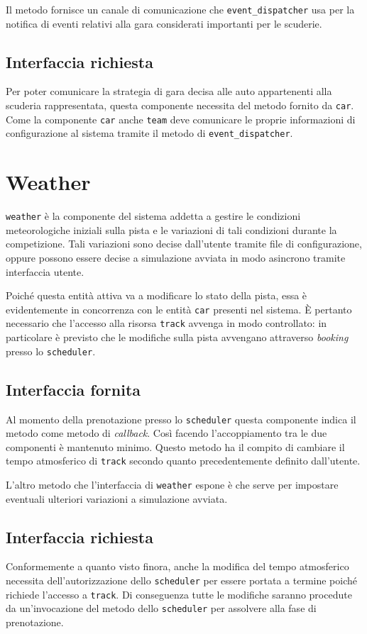 Il metodo  fornisce un canale di comunicazione che \texttt{event\_dispatcher} usa per la notifica di eventi relativi alla gara considerati importanti per le scuderie.

\subsection*{Interfaccia richiesta}
Per poter comunicare la strategia di gara decisa alle auto appartenenti alla scuderia rappresentata, questa componente necessita del metodo  fornito da \texttt{car}.
Come la componente \texttt{car} anche \texttt{team} deve comunicare le proprie informazioni di configurazione al sistema tramite il metodo  di \texttt{event\_dispatcher}.

\section{Weather}
\texttt{weather} è la componente del sistema addetta a gestire le condizioni meteorologiche iniziali sulla pista e le variazioni di tali condizioni durante la competizione. Tali variazioni sono decise dall'utente tramite file di configurazione, oppure possono essere decise a simulazione avviata in modo asincrono tramite interfaccia utente.

Poiché questa entità attiva va a modificare lo stato della pista, essa è evidentemente in concorrenza con le entità \texttt{car} presenti nel sistema. \`E pertanto necessario che l'accesso alla risorsa \texttt{track} avvenga in modo controllato: in particolare è previsto che le modifiche sulla pista avvengano attraverso \textit{booking} presso lo \texttt{scheduler}.

\subsection*{Interfaccia fornita}
Al momento della prenotazione presso lo \texttt{scheduler} questa componente indica il metodo  come metodo di \textit{callback}. Così facendo l'accoppiamento tra le due componenti è mantenuto minimo. Questo metodo ha il compito di cambiare il tempo atmosferico di \texttt{track} secondo quanto precedentemente definito dall'utente.

L'altro metodo che l'interfaccia di \texttt{weather} espone è  che serve per impostare eventuali ulteriori variazioni a simulazione avviata.

\subsection*{Interfaccia richiesta}
Conformemente a quanto visto finora, anche la modifica del tempo atmosferico necessita dell'autorizzazione dello \texttt{scheduler} per essere portata a termine poiché richiede l'accesso a \texttt{track}. Di conseguenza tutte le modifiche saranno procedute da un'invocazione del metodo  dello \texttt{scheduler} per assolvere alla fase di prenotazione.

